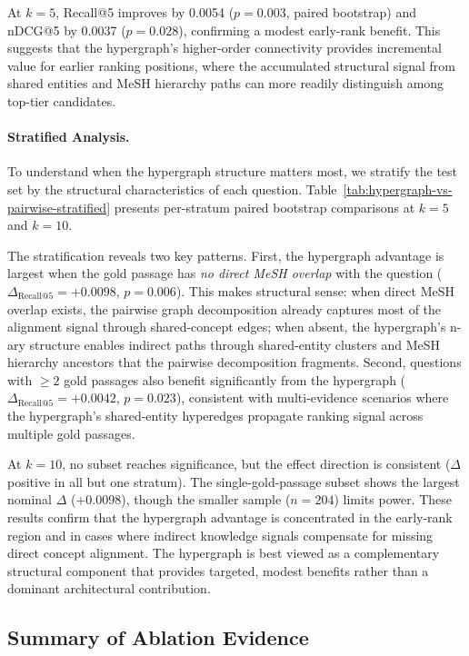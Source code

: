 At $k{=}5$, Recall@5 improves by 0.0054 ($p{=}0.003$, paired bootstrap) and nDCG@5 by 0.0037 ($p{=}0.028$), confirming a modest early-rank benefit. This suggests that the hypergraph's higher-order connectivity provides incremental value for earlier ranking positions, where the accumulated structural signal from shared entities and MeSH hierarchy paths can more readily distinguish among top-tier candidates.

\paragraph{Stratified Analysis.} To understand when the hypergraph structure matters most, we stratify the test set by the structural characteristics of each question. Table~\ref{tab:hypergraph-vs-pairwise-stratified} presents per-stratum paired bootstrap comparisons at $k{=}5$ and $k{=}10$.



The stratification reveals two key patterns. First, the hypergraph advantage is largest when the gold passage has \textit{no direct MeSH overlap} with the question ($\Delta_{\text{Recall@5}} = +0.0098$, $p=0.006$). This makes structural sense: when direct MeSH overlap exists, the pairwise graph decomposition already captures most of the alignment signal through shared-concept edges; when absent, the hypergraph's n-ary structure enables indirect paths through shared-entity clusters and MeSH hierarchy ancestors that the pairwise decomposition fragments. Second, questions with $\geq 2$ gold passages also benefit significantly from the hypergraph ($\Delta_{\text{Recall@5}} = +0.0042$, $p=0.023$), consistent with multi-evidence scenarios where the hypergraph's shared-entity hyperedges propagate ranking signal across multiple gold passages.

At $k{=}10$, no subset reaches significance, but the effect direction is consistent ($\Delta$ positive in all but one stratum). The single-gold-passage subset shows the largest nominal $\Delta$ (+0.0098), though the smaller sample ($n=204$) limits power. These results confirm that the hypergraph advantage is concentrated in the early-rank region and in cases where indirect knowledge signals compensate for missing direct concept alignment. The hypergraph is best viewed as a complementary structural component that provides targeted, modest benefits rather than a dominant architectural contribution.

\subsection{Summary of Ablation Evidence}


